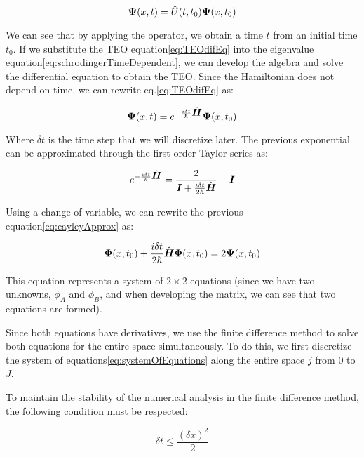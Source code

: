 \begin{equation}
    \label{eq:TEOdifEq}
    \mbox{\boldmath $\Psi$}(x,t)=\hat{U}(t,t_0)\mbox{\boldmath $\Psi$}(x,t_0)
\end{equation}

\noindent We can see that by applying the operator, we obtain a time $t$ from an initial time $t_0$.
If we substitute the TEO equation\eqref{eq:TEOdifEq} into the eigenvalue equation\eqref{eq:schrodingerTimeDependent}, we can develop the algebra and solve the differential equation to obtain the TEO\@.
Since the Hamiltonian does not depend on time, we can rewrite eq.\eqref{eq:TEOdifEq} as:

\begin{equation}
    \label{eq:TEOApplied}
    \mbox{\boldmath $\Psi$}(x,t)= e^{-\frac{i\delta t}{\hbar}\hat{\mbox{\boldmath $H$}}} \mbox{\boldmath $\Psi$}(x,t_0)
\end{equation}

\noindent Where $\delta t$ is the time step that we will discretize later.
The previous exponential can be approximated through the first-order Taylor series as:

\begin{equation}
    \label{eq:cayleyApprox}
    e^{-\frac{i\delta t}{\hbar}\hat{\mbox{\boldmath $H$}}} = \frac{2}{\mbox{\boldmath $I$} + \frac{i\delta t}{2\hbar}\hat{\mbox{\boldmath $H$}}}-\mbox{\boldmath $I$}
\end{equation}

Using a change of variable, we can rewrite the previous equation\eqref{eq:cayleyApprox} as:

\begin{equation}
    \label{eq:systemOfEquations}
    \mbox{\boldmath $\Phi$}(x,t_0) + \frac{i\delta t}{2\hbar}\hat{\mbox{\boldmath $H$}}\mbox{\boldmath $\Phi$}(x,t_0)=2\mbox{\boldmath $\Psi$}(x,t_0)
\end{equation}

\noindent This equation represents a system of $2\times2$ equations (since we have two unknowns, $\phi_A$ and $\phi_B$, and when developing the matrix, we can see that two equations are formed).

Since both equations have derivatives, we use the finite difference method to solve both equations for the entire space simultaneously.
To do this, we first discretize the system of equations\eqref{eq:systemOfEquations} along the entire space $j$ from $0$ to $J$.

To maintain the stability of the numerical analysis in the finite difference method, the following condition must be respected\cite{Carrillo2015}:

\begin{equation}
    \label{eq:stabilityCondition}
    \delta t \leq \frac{\left( \delta x \right)^2}{2}
\end{equation}

